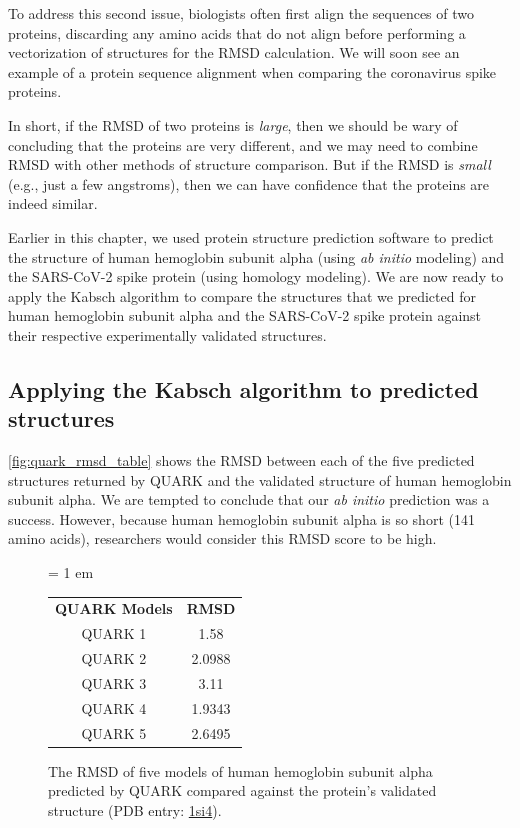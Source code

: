 To address this second issue, biologists often first align the sequences of two proteins, discarding any amino acids that do not align before performing a vectorization of structures for the RMSD calculation. We will soon see an example of a protein sequence alignment when comparing the coronavirus spike proteins.

In short, if the RMSD of two proteins is \textit{large}, then we should be wary of concluding that the proteins are very different, and we may need to combine RMSD with other methods of structure comparison. But if the RMSD is \textit{small} (e.g., just a few angstroms), then we can have confidence that the proteins are indeed similar.

Earlier in this chapter, we used protein structure prediction software to predict the structure of human hemoglobin subunit alpha (using \textit{ab initio} modeling) and the SARS-CoV-2 spike protein (using homology modeling). We are now ready to apply the Kabsch algorithm to compare the structures that we predicted for human hemoglobin subunit alpha and the SARS-CoV-2 spike protein against their respective experimentally validated structures. 

\FloatBarrier
{}
\subsection{Applying the Kabsch algorithm to predicted structures}

\autoref{fig:quark_rmsd_table} shows the RMSD between each of the five predicted structures returned by QUARK and the validated structure of human hemoglobin subunit alpha. We are tempted to conclude that our \textit{ab initio} prediction was a success. However, because human hemoglobin subunit alpha is so short (141 amino acids), researchers would consider this RMSD score to be high.\\

\begin{figure}[h]
	\centering
	\tabcolsep = 1 em
	\mySfFamily
	\begin{tabular}{c c}
		\textbf{QUARK Models} & \textbf{RMSD} \\
		QUARK 1 & 1.58\phantom{xx} \\
		QUARK 2 & 2.0988\\
		QUARK 3 & 3.11\phantom{xx} \\
		QUARK 4 & 1.9343\\
		QUARK 5 & 2.6495
	\end{tabular}
	\caption{The RMSD of five models of human hemoglobin subunit alpha predicted by QUARK compared against the protein's validated structure (PDB entry: \href{https://www.rcsb.org/structure/1si4}{1si4}).}
	\label{fig:quark_rmsd_table}
\end{figure}

